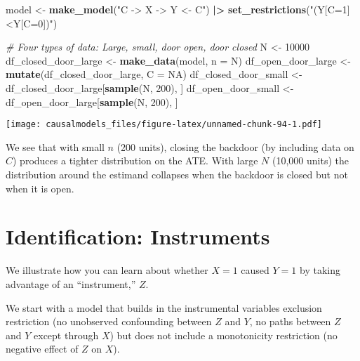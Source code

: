 \documentclass[
  12pt,
]{book}
\newenvironment{Shaded}{\begin{snugshade}}{\end{snugshade}}
\newcommand{\AttributeTok}[1]{\textcolor[rgb]{0.13,0.29,0.53}{#1}}
\newcommand{\CommentTok}[1]{\textcolor[rgb]{0.56,0.35,0.01}{\textit{#1}}}
\newcommand{\ConstantTok}[1]{\textcolor[rgb]{0.56,0.35,0.01}{#1}}
\newcommand{\DecValTok}[1]{\textcolor[rgb]{0.00,0.00,0.81}{#1}}
\newcommand{\FunctionTok}[1]{\textcolor[rgb]{0.13,0.29,0.53}{\textbf{#1}}}
\newcommand{\NormalTok}[1]{#1}
\newcommand{\OtherTok}[1]{\textcolor[rgb]{0.56,0.35,0.01}{#1}}
\newcommand{\SpecialCharTok}[1]{\textcolor[rgb]{0.81,0.36,0.00}{\textbf{#1}}}
\newcommand{\StringTok}[1]{\textcolor[rgb]{0.31,0.60,0.02}{#1}}
\begin{document}
\begin{Shaded}
\begin{Highlighting}[]
\NormalTok{model }\OtherTok{\textless{}{-}} \FunctionTok{make\_model}\NormalTok{(}\StringTok{"C {-}\textgreater{} X {-}\textgreater{} Y \textless{}{-} C"}\NormalTok{)  }\SpecialCharTok{|\textgreater{}}
         \FunctionTok{set\_restrictions}\NormalTok{(}\StringTok{"(Y[C=1]\textless{}Y[C=0])"}\NormalTok{)}


\CommentTok{\# Four types of data: Large, small, door open, door closed}
\NormalTok{N }\OtherTok{\textless{}{-}} \DecValTok{10000}
\NormalTok{df\_closed\_door\_large }\OtherTok{\textless{}{-}} \FunctionTok{make\_data}\NormalTok{(model, }\AttributeTok{n =}\NormalTok{ N)}
\NormalTok{df\_open\_door\_large   }\OtherTok{\textless{}{-}} \FunctionTok{mutate}\NormalTok{(df\_closed\_door\_large, }\AttributeTok{C =} \ConstantTok{NA}\NormalTok{)}
\NormalTok{df\_closed\_door\_small }\OtherTok{\textless{}{-}}\NormalTok{ df\_closed\_door\_large[}\FunctionTok{sample}\NormalTok{(N, }\DecValTok{200}\NormalTok{), ]}
\NormalTok{df\_open\_door\_small   }\OtherTok{\textless{}{-}}\NormalTok{ df\_open\_door\_large[}\FunctionTok{sample}\NormalTok{(N, }\DecValTok{200}\NormalTok{), ]}
\end{Highlighting}
\end{Shaded}

\texttt{[image: causalmodels\_files/figure-latex/unnamed-chunk-94-1.pdf]}

We see that with small \(n\) (200 units), closing the backdoor (by including data on \(C\)) produces a tighter distribution on the ATE. With large \(N\) (10,000 units) the distribution around the estimand collapses when the backdoor is closed but not when it is open.

\hypertarget{identification-instruments}{%
\section{Identification: Instruments}\label{identification-instruments}}

We illustrate how you can learn about whether \(X=1\) caused \(Y=1\) by taking advantage of an ``instrument,'' \(Z\).

We start with a model that builds in the instrumental variables exclusion restriction (no unobserved confounding between \(Z\) and \(Y\), no paths between \(Z\) and \(Y\) except through \(X\)) but does not include a monotonicity restriction (no negative effect of \(Z\) on \(X\)).
\end{document}
